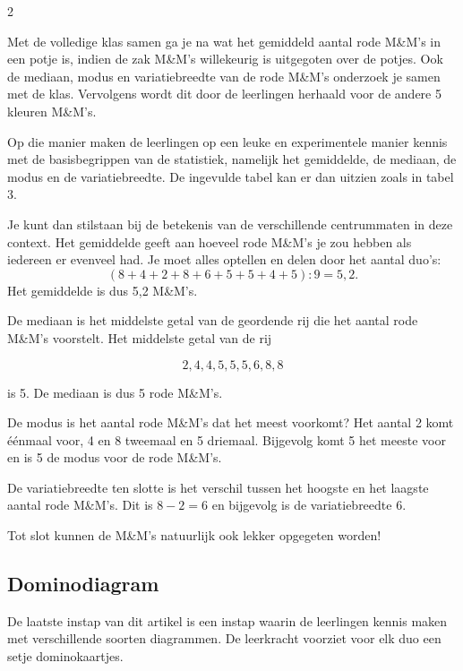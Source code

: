\begin{multicols}{2}


Met de volledige klas samen ga je na wat het gemiddeld aantal rode M\&M’s in een potje is, indien de zak M\&M’s willekeurig is uitgegoten over de potjes. Ook de mediaan, modus en variatiebreedte van de rode M\&M’s onderzoek je samen met de klas. Vervolgens wordt dit door de leerlingen herhaald voor de andere 5 kleuren M\&M’s.

Op die manier maken de leerlingen op een leuke en experimentele manier kennis met de basisbegrippen van de statistiek, namelijk het gemiddelde, de mediaan, de modus en de variatiebreedte.
De ingevulde tabel kan er dan uitzien zoals in tabel 3.

Je kunt dan stilstaan bij de betekenis van de verschillende centrummaten in deze context. Het gemiddelde geeft aan hoeveel rode M\&M’s je zou hebben als iedereen er evenveel had. Je moet alles optellen en delen door het aantal duo's:
$$(8+4+2+8+6+5+5+4+5) : 9 = 5,2.$$
Het gemiddelde is dus 5,2 M\&M’s.

De mediaan is het middelste getal van de geordende rij die het aantal rode M\&M’s voorstelt. Het middelste getal van de rij

$$2, 4, 4, 5, 5, 5, 6, 8, 8$$

is 5. De mediaan is dus 5 rode M\&M’s.

De modus is het aantal rode M\&M’s dat het meest voorkomt? Het aantal 2 komt éénmaal voor, 4 en 8 tweemaal en 5 driemaal. Bijgevolg komt 5 het meeste voor en is 5 de modus voor de rode M\&M’s.

De variatiebreedte ten slotte is het verschil tussen het hoogste en het laagste aantal rode M\&M’s. Dit is $8-2 =  6$ en bijgevolg is de variatiebreedte 6.

Tot slot kunnen de M\&M’s natuurlijk ook lekker opgegeten worden!

\subsection{Dominodiagram}
De laatste instap van dit artikel is een instap waarin de leerlingen kennis maken met verschillende soorten diagrammen. De leerkracht voorziet voor elk duo een setje dominokaartjes.

\end{multicols}
